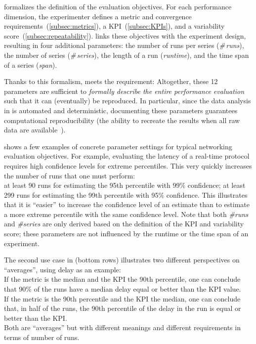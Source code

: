 \triscale formalizes the definition of the evaluation objectives. For each performance dimension, the experimenter defines a metric and convergence requirements~(\cref{subsec:metrics}), a KPI~(\cref{subsec:KPIs}), and a variability score~(\cref{subsec:repeatability}).
\triscale links these objectives with the experiment design, resulting in four additional parameters: the number of runs per series (\emph{\#\,runs}), the number of series (\emph{\#\,series}), the length of a run (\emph{runtime}), and the time span of a series (\emph{span}).

Thanks to this formalism, \triscale meets the  requirement:
Altogether, these 12 parameters are sufficient to \emph{formally describe the entire performance evaluation} such that it can (eventually) be reproduced.
In particular, since the data analysis in \triscale is automated and deterministic, documenting these parameters guarantees computational reproducibility (the ability to recreate the results when all raw data are available~\cite{liu19computational}).

 shows a few examples of concrete parameter settings for typical networking evaluation objectives.
For example, evaluating the latency of a real-time protocol requires high confidence levels for extreme percentiles.
This very quickly increases the number of runs that one must perform:\\
\inlineitem
  at least 90 runs for estimating the 95th percentile with 99\% confidence;\linebreak
\inlineitem
  at least 299 runs for estimating the 99th percentile with 95\% confidence.\linebreak
This illustrates that it is ``easier'' to increase the confidence level of an estimate than to estimate a more extreme percentile with the same confidence level.
Note that both \emph{\#runs} and \emph{\#series} are only derived based on the definition of the KPI and variability score; these parameters are not influenced by the runtime or the time span of an experiment.

The second use case in  (bottom rows) illustrates two different perspectives on ``averages'', using delay as an example:
\\
    \inlineitem
    If the metric is the median and the KPI the 90th percentile, one can conclude that 90\% of the runs have a median delay equal or better than the KPI value.
\\
    \inlineitem
    If the metric is the 90th percentile and the KPI the median, one can conclude that, in half of the runs, the 90th percentile of the delay in the run is equal or better than the KPI.
\\
Both are ``averages'' but with different meanings and different requirements in terms of number of runs.


